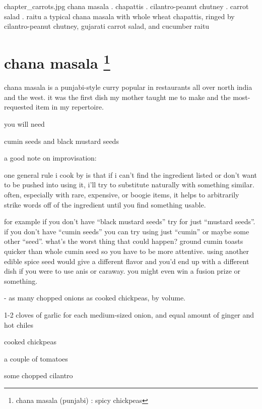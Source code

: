 \mychapter
{chapter_carrots.jpg}
{chana masala . chapattis . cilantro-peanut chutney . carrot salad . raitu}
{a typical chana masala with whole wheat chapattis,
ringed by cilantro-peanut chutney, gujarati carrot salad, and cucumber
raitu}

\section{chana masala
\footnote{chana masala (punjabi) : spicy chickpeas}}

chana masala is a punjabi-style curry popular in restaurants all over north 
india and the west. it was the first dish my mother taught me to make and the 
most-requested item in my repertoire.

you will need

\begin{ingredients}
  \item cumin seeds and black mustard seeds
\end{ingredients}

a good note on improvisation:

one general rule i cook by is that if i can't find the ingredient listed or 
don't want to be pushed into using it, i'll try to substitute naturally with 
something similar. often, especially with rare, expensive, or boogie items, it 
helps to arbitrarily strike words off of the ingredient until you find 
something usable.

for example if you don't have ``black mustard seeds'' try for just ``mustard 
seeds''. if you don't have ``cumin seeds'' you can try using just ``cumin'' or 
maybe some other ``seed''. what's the worst thing that could happen? ground 
cumin toasts quicker than whole cumin seed so you have to be more attentive. 
using another edible spice seed would give a different flavor and you'd end up 
with a different dish if you were to use anis or caraway. you might even win a 
fusion prize or something.

\begin{ingredients}
  \item \onethird - \onehalf as many chopped onions as cooked chickpeas, by volume.
  \item 1-2 cloves of garlic for each medium-sized onion, and equal amount of ginger and hot chiles
  \item cooked chickpeas
  \item a couple of tomatoes
  \item some chopped cilantro
\end{ingredients}


